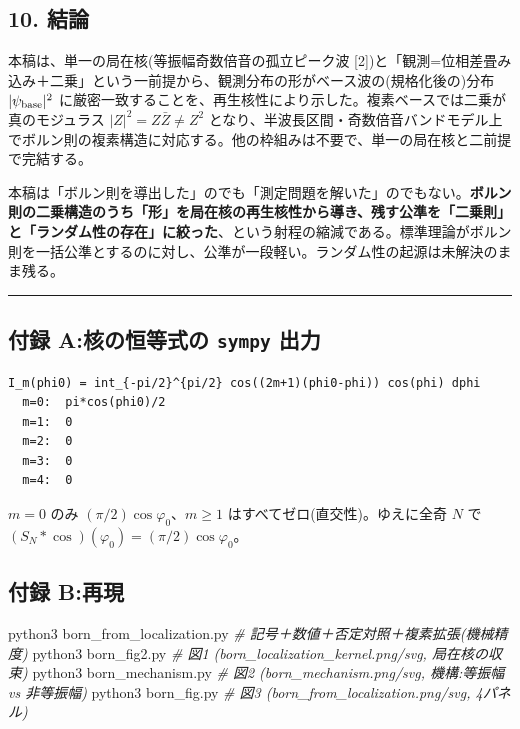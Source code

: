 \documentclass[
]{ltjsarticle}
\newenvironment{Shaded}{}{}
\newcommand{\CommentTok}[1]{\textcolor[rgb]{0.38,0.63,0.69}{\textit{#1}}}
\newcommand{\ExtensionTok}[1]{#1}
\newcommand{\NormalTok}[1]{#1}
\begin{document}
\subsection{10. 結論}\label{ux7d50ux8ad6}

本稿は、単一の局在核(等振幅奇数倍音の孤立ピーク波
{[}2{]})と「観測=位相差畳み込み＋二乗」という一前提から、観測分布の形がベース波の(規格化後の)分布
\(|\psi_{\rm base}|^2\)
に厳密一致することを、再生核性により示した。複素ベースでは二乗が真のモジュラス
\(|Z|^2=Z\bar Z\ne Z^2\)
となり、半波長区間・奇数倍音バンドモデル上でボルン則の複素構造に対応する。他の枠組みは不要で、単一の局在核と二前提で完結する。

本稿は「ボルン則を導出した」のでも「測定問題を解いた」のでもない。\textbf{ボルン則の二乗構造のうち「形」を局在核の再生核性から導き、残す公準を「二乗則」と「ランダム性の存在」に絞った}、という射程の縮減である。標準理論がボルン則を一括公準とするのに対し、公準が一段軽い。ランダム性の起源は未解決のまま残る。

\begin{center}\rule{0.5\linewidth}{0.5pt}\end{center}

\subsection{\texorpdfstring{付録 A:核の恒等式の \texttt{sympy}
出力}{付録 A:核の恒等式の sympy 出力}}\label{ux4ed8ux9332-aux6838ux306eux6052ux7b49ux5f0fux306e-sympy-ux51faux529b}

\begin{verbatim}
I_m(phi0) = int_{-pi/2}^{pi/2} cos((2m+1)(phi0-phi)) cos(phi) dphi
  m=0:  pi*cos(phi0)/2
  m=1:  0
  m=2:  0
  m=3:  0
  m=4:  0
\end{verbatim}

\(m=0\) のみ \((\pi/2)\cos\varphi_0\)、\(m\ge1\)
はすべてゼロ(直交性)。ゆえに全奇 \(N\) で
\((S_N*\cos)(\varphi_0)=(\pi/2)\cos\varphi_0\)。

\subsection{付録 B:再現}\label{ux4ed8ux9332-bux518dux73fe}

\begin{Shaded}
\begin{Highlighting}[]
\ExtensionTok{python3}\NormalTok{ born\_from\_localization.py     }\CommentTok{\# 記号＋数値＋否定対照＋複素拡張(機械精度)}
\ExtensionTok{python3}\NormalTok{ born\_fig2.py                   }\CommentTok{\# 図1 (born\_localization\_kernel.png/svg, 局在核の収束)}
\ExtensionTok{python3}\NormalTok{ born\_mechanism.py              }\CommentTok{\# 図2 (born\_mechanism.png/svg, 機構:等振幅 vs 非等振幅)}
\ExtensionTok{python3}\NormalTok{ born\_fig.py                    }\CommentTok{\# 図3 (born\_from\_localization.png/svg, 4パネル)}
\end{Highlighting}
\end{Shaded}
\end{document}
